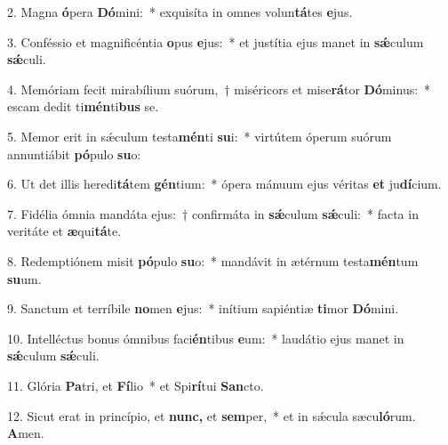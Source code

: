 \item 2. Magna \textbf{ó}pera \textbf{Dó}mini:~* exquisíta in omnes volun\textbf{tá}tes \textbf{e}jus.

\item 3. Conféssio et magnificéntia \textbf{o}pus \textbf{e}jus:~* et justítia ejus manet in \textbf{sǽ}culum \textbf{sǽ}culi.

\item 4. Memóriam fecit mirabílium suórum,~† miséricors et mise\textbf{rá}tor \textbf{Dó}minus:~* escam dedit ti\textbf{mén}ti\textbf{bus} se.

\item 5. Memor erit in sǽculum testa\textbf{mén}ti \textbf{su}i:~* virtútem óperum suórum annuntiábit \textbf{pó}pulo \textbf{su}o:

\item 6. Ut det illis heredi\textbf{tá}tem \textbf{gén}tium:~* ópera mánuum ejus véritas \textbf{et} ju\textbf{dí}cium.

\item 7. Fidélia ómnia mandáta ejus:~† confirmáta in \textbf{sǽ}culum \textbf{sǽ}culi:~* facta in veritáte et \textbf{æ}qui\textbf{tá}te.

\item 8. Redemptiónem misit \textbf{pó}pulo \textbf{su}o:~* mandávit in ætérnum testa\textbf{mén}tum \textbf{su}um.

\item 9. Sanctum et terríbile \textbf{no}men \textbf{e}jus:~* inítium sapiéntiæ \textbf{ti}mor \textbf{Dó}mini.

\item 10. Intelléctus bonus ómnibus faci\textbf{én}tibus \textbf{e}um:~* laudátio ejus manet in \textbf{sǽ}culum \textbf{sǽ}culi.

\item 11. Glória \textbf{Pa}tri, et \textbf{Fí}lio~* et Spi\textbf{rí}tui \textbf{San}cto.

\item 12. Sicut erat in princípio, et \textbf{nunc,} et \textbf{sem}per,~* et in sǽcula sæcu\textbf{ló}rum. \textbf{A}men.